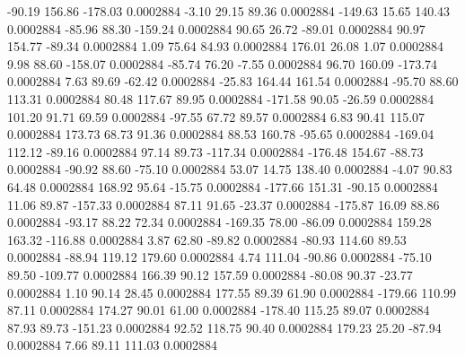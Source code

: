       -90.19      156.86     -178.03     0.0002884
       -3.10       29.15       89.36     0.0002884
     -149.63       15.65      140.43     0.0002884
      -85.96       88.30     -159.24     0.0002884
       90.65       26.72      -89.01     0.0002884
       90.97      154.77      -89.34     0.0002884
        1.09       75.64       84.93     0.0002884
      176.01       26.08        1.07     0.0002884
        9.98       88.60     -158.07     0.0002884
      -85.74       76.20       -7.55     0.0002884
       96.70      160.09     -173.74     0.0002884
        7.63       89.69      -62.42     0.0002884
      -25.83      164.44      161.54     0.0002884
      -95.70       88.60      113.31     0.0002884
       80.48      117.67       89.95     0.0002884
     -171.58       90.05      -26.59     0.0002884
      101.20       91.71       69.59     0.0002884
      -97.55       67.72       89.57     0.0002884
        6.83       90.41      115.07     0.0002884
      173.73       68.73       91.36     0.0002884
       88.53      160.78      -95.65     0.0002884
     -169.04      112.12      -89.16     0.0002884
       97.14       89.73     -117.34     0.0002884
     -176.48      154.67      -88.73     0.0002884
      -90.92       88.60      -75.10     0.0002884
       53.07       14.75      138.40     0.0002884
       -4.07       90.83       64.48     0.0002884
      168.92       95.64      -15.75     0.0002884
     -177.66      151.31      -90.15     0.0002884
       11.06       89.87     -157.33     0.0002884
       87.11       91.65      -23.37     0.0002884
     -175.87       16.09       88.86     0.0002884
      -93.17       88.22       72.34     0.0002884
     -169.35       78.00      -86.09     0.0002884
      159.28      163.32     -116.88     0.0002884
        3.87       62.80      -89.82     0.0002884
      -80.93      114.60       89.53     0.0002884
      -88.94      119.12      179.60     0.0002884
        4.74      111.04      -90.86     0.0002884
      -75.10       89.50     -109.77     0.0002884
      166.39       90.12      157.59     0.0002884
      -80.08       90.37      -23.77     0.0002884
        1.10       90.14       28.45     0.0002884
      177.55       89.39       61.90     0.0002884
     -179.66      110.99       87.11     0.0002884
      174.27       90.01       61.00     0.0002884
     -178.40      115.25       89.07     0.0002884
       87.93       89.73     -151.23     0.0002884
       92.52      118.75       90.40     0.0002884
      179.23       25.20      -87.94     0.0002884
        7.66       89.11      111.03     0.0002884
